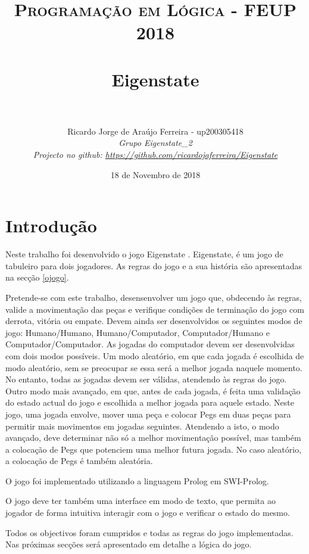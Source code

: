 \documentclass[paper=a4, fontsize=11pt]{scrartcl} %
\title{	
\normalfont \normalsize 
\textsc{Programação em Lógica - FEUP 2018} \\ [25pt] %
\horrule{0.5pt} \\[0.4cm] %
\huge Eigenstate \\ %
\horrule{2pt} \\[0.5cm] %
}
\author{
	Ricardo Jorge de Araújo Ferreira - up200305418\\
	\normalsize\itshape Grupo Eigenstate\_2\\
	\small Projecto no github: \url{https://github.com/ricardojaferreira/Eigenstate}
} %
\date{\normalsize 18 de Novembro de 2018} %
\numberwithin{equation}{section} %
\numberwithin{figure}{section} %
\numberwithin{table}{section} %
\begin{document}
\maketitle %

\section{Introdução}

Neste trabalho foi desenvolvido o jogo Eigenstate \cite{GameGeek:2018}. Eigenstate, é um jogo de tabuleiro para dois jogadores. As regras do jogo e a sua história são apresentadas na secção \ref{ojogo}.

Pretende-se com este trabalho, desensenvolver um jogo que, obdecendo às regras, valide a movimentação das peças e verifique condições de terminação do jogo com derrota, vitória ou empate. Devem ainda ser desenvolvidos os seguintes modos de jogo: Humano/Humano, Humano/Computador, Computador/Humano e Computador/Computador. As jogadas do computador devem ser desenvolvidas com dois modos possíveis. Um modo aleatório, em que cada jogada é escolhida de modo aleatório, sem se preocupar se essa será a melhor jogada naquele momento. No entanto, todas as jogadas devem ser válidas, atendendo às regras do jogo. Outro modo mais avançado, em que, antes de cada jogada, é feita uma validação do estado actual do jogo e escolhida a melhor jogada para aquele estado. Neste jogo, uma jogada envolve, mover uma peça e colocar Pegs em duas peças para permitir mais movimentos em jogadas seguintes. Atendendo a isto, o modo avançado, deve determinar não só a melhor movimentação possível, mas também a colocação de Pegs que potenciem uma melhor futura jogada. No caso aleatório, a colocação de Pegs é também aleatória.

O jogo foi implementado utilizando a linguagem Prolog em SWI-Prolog.

O jogo deve ter também uma interface em modo de texto, que permita ao jogador de forma intuitiva interagir com o jogo e verificar o estado do mesmo.

Todos os objectivos foram cumpridos e todas as regras do jogo implementadas. Nas próximas secções será apresentado em detalhe a lógica do jogo.


\end{document}
